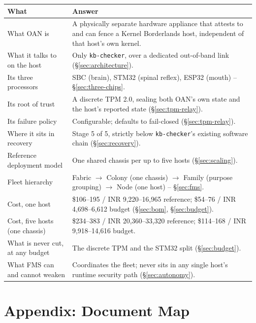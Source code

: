 \documentclass[11pt,a4paper]{article}
\begin{document}
\begin{center}
\renewcommand{\arraystretch}{1.35}
\small
\begin{longtable}{@{}p{3.6cm}p{9.8cm}@{}}
\toprule
\textbf{What} & \textbf{Answer} \\
\midrule
\endhead
What OAN is & A physically separate hardware appliance that attests to
and can fence a Kernel Borderlands host, independent of that host's own
kernel. \\
What it talks to on the host & Only \texttt{kb-checker}, over a
dedicated out-of-band link (\S\ref{sec:architecture}). \\
Its three processors & SBC (brain), STM32 (spinal reflex), ESP32
(mouth) -- \S\ref{sec:three-chips}. \\
Its root of trust & A discrete TPM 2.0, sealing both OAN's own state
and the host's reported state (\S\ref{sec:tpm-relay}). \\
Its failure policy & Configurable; defaults to fail-closed
(\S\ref{sec:tpm-relay}). \\
Where it sits in recovery & Stage 5 of 5, strictly below
\texttt{kb-checker}'s existing software chain (\S\ref{sec:recovery}). \\
Reference deployment model & One shared chassis per up to five hosts
(\S\ref{sec:scaling}). \\
Fleet hierarchy & Fabric $\to$ Colony (one chassis) $\to$ Family
(purpose grouping) $\to$ Node (one host) -- \S\ref{sec:fms}. \\
Cost, one host & \$106--195 / INR 9,220--16,965 reference; \$54--76 /
INR 4,698--6,612 budget (\S\ref{sec:bom}, \S\ref{sec:budget}). \\
Cost, five hosts (one chassis) & \$234--383 / INR 20,360--33,320
reference; \$114--168 / INR 9,918--14,616 budget. \\
What is never cut, at any budget & The discrete TPM and the STM32
split (\S\ref{sec:budget}). \\
What FMS can and cannot weaken & Coordinates the fleet; never sits in
any single host's runtime security path (\S\ref{sec:autonomy}). \\
\bottomrule
\end{longtable}
\end{center}

\section{Appendix: Document Map}
\end{document}
